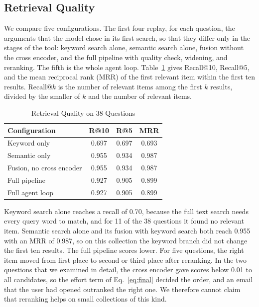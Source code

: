 \documentclass[conference]{IEEEtran}
\begin{document}
\subsection{Retrieval Quality}
We compare five configurations. The first four replay, for each question, the arguments that the model chose in its first search, so that they differ only in the stages of the tool: keyword search alone, semantic search alone, fusion without the cross encoder, and the full pipeline with quality check, widening, and reranking. The fifth is the whole agent loop. Table~\ref{tab:results} gives Recall@10, Recall@5, and the mean reciprocal rank (MRR) of the first relevant item within the first ten results. Recall@$k$ is the number of relevant items among the first $k$ results, divided by the smaller of $k$ and the number of relevant items.

\begin{table}[t]
\caption{Retrieval Quality on 38 Questions}
\label{tab:results}
\centering
\renewcommand{\arraystretch}{1.15}
\begin{tabular}{|l|c|c|c|}
\hline
\textbf{Configuration} & \textbf{R@10} & \textbf{R@5} & \textbf{MRR} \\
\hline
Keyword only & 0.697 & 0.697 & 0.693 \\
\hline
Semantic only & 0.955 & 0.934 & 0.987 \\
\hline
Fusion, no cross encoder & 0.955 & 0.934 & 0.987 \\
\hline
Full pipeline & 0.927 & 0.905 & 0.899 \\
\hline
Full agent loop & 0.927 & 0.905 & 0.899 \\
\hline
\end{tabular}
\end{table}

Keyword search alone reaches a recall of 0.70, because the full text search needs every query word to match, and for 11 of the 38 questions it found no relevant item. Semantic search alone and its fusion with keyword search both reach 0.955 with an MRR of 0.987, so on this collection the keyword branch did not change the first ten results. The full pipeline scores lower. For five questions, the right item moved from first place to second or third place after reranking. In the two questions that we examined in detail, the cross encoder gave scores below 0.01 to all candidates, so the effort term of Eq.~\ref{eq:final} decided the order, and an email that the user had opened outranked the right one. We therefore cannot claim that reranking helps on small collections of this kind.
\end{document}
